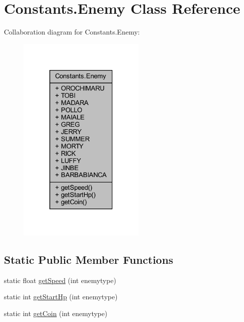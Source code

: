\hypertarget{classhelpz_1_1_constants_1_1_enemy}{}\section{Constants.\+Enemy Class Reference}
\label{classhelpz_1_1_constants_1_1_enemy}


Collaboration diagram for Constants.\+Enemy\+:\nopagebreak
\begin{figure}[H]
\begin{center}
\leavevmode
\includegraphics[width=175pt]{classhelpz_1_1_constants_1_1_enemy__coll__graph}
\end{center}
\end{figure}
\subsection*{Static Public Member Functions}
\begin{DoxyCompactItemize}
\item 
static float \hyperlink{classhelpz_1_1_constants_1_1_enemy_ae580ad256190536e1616820765f54da5}{get\+Speed} (int enemytype)
\item 
static int \hyperlink{classhelpz_1_1_constants_1_1_enemy_af1c8177a32688b808a404068598de756}{get\+Start\+Hp} (int enemytype)
\item 
static int \hyperlink{classhelpz_1_1_constants_1_1_enemy_ad9bfb7d57265918ecda5f2892ff8b015}{get\+Coin} (int enemytype)
\end{DoxyCompactItemize}

